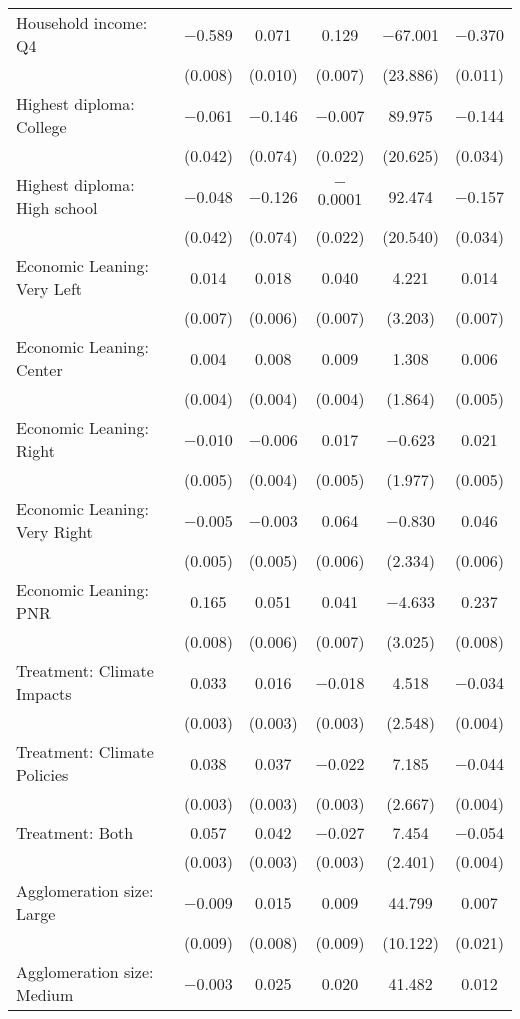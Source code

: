 \begin{tabular}{@{\extracolsep{5pt}}lccccc}
  Household income: Q4 & $-$0.589 & 0.071 & 0.129 & $-$67.001 & $-$0.370 \\ 
  & (0.008) & (0.010) & (0.007) & (23.886) & (0.011) \\ 
  Highest diploma: College & $-$0.061 & $-$0.146 & $-$0.007 & 89.975 & $-$0.144 \\ 
  & (0.042) & (0.074) & (0.022) & (20.625) & (0.034) \\ 
  Highest diploma: High school & $-$0.048 & $-$0.126 & $-$0.0001 & 92.474 & $-$0.157 \\ 
  & (0.042) & (0.074) & (0.022) & (20.540) & (0.034) \\ 
  Economic Leaning: Very Left & 0.014 & 0.018 & 0.040 & 4.221 & 0.014 \\ 
  & (0.007) & (0.006) & (0.007) & (3.203) & (0.007) \\ 
  Economic Leaning: Center & 0.004 & 0.008 & 0.009 & 1.308 & 0.006 \\ 
  & (0.004) & (0.004) & (0.004) & (1.864) & (0.005) \\ 
  Economic Leaning: Right & $-$0.010 & $-$0.006 & 0.017 & $-$0.623 & 0.021 \\ 
  & (0.005) & (0.004) & (0.005) & (1.977) & (0.005) \\ 
  Economic Leaning: Very Right & $-$0.005 & $-$0.003 & 0.064 & $-$0.830 & 0.046 \\ 
  & (0.005) & (0.005) & (0.006) & (2.334) & (0.006) \\ 
  Economic Leaning: PNR & 0.165 & 0.051 & 0.041 & $-$4.633 & 0.237 \\ 
  & (0.008) & (0.006) & (0.007) & (3.025) & (0.008) \\ 
  Treatment: Climate Impacts & 0.033 & 0.016 & $-$0.018 & 4.518 & $-$0.034 \\ 
  & (0.003) & (0.003) & (0.003) & (2.548) & (0.004) \\ 
  Treatment: Climate Policies & 0.038 & 0.037 & $-$0.022 & 7.185 & $-$0.044 \\ 
  & (0.003) & (0.003) & (0.003) & (2.667) & (0.004) \\ 
  Treatment: Both & 0.057 & 0.042 & $-$0.027 & 7.454 & $-$0.054 \\ 
  & (0.003) & (0.003) & (0.003) & (2.401) & (0.004) \\ 
  Agglomeration size: Large & $-$0.009 & 0.015 & 0.009 & 44.799 & 0.007 \\ 
  & (0.009) & (0.008) & (0.009) & (10.122) & (0.021) \\ 
  Agglomeration size: Medium & $-$0.003 & 0.025 & 0.020 & 41.482 & 0.012 \\ 

\end{tabular}
